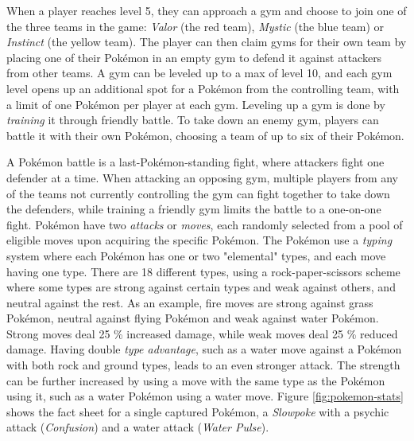 When a player reaches level 5, they can approach a gym and choose to join one of the three teams in the game: \emph{Valor} (the red team), \emph{Mystic} (the blue team) or \emph{Instinct} (the yellow team). The player can then claim gyms for their own team by placing one of their Pokémon in an empty gym to defend it against attackers from other teams. A gym can be leveled up to a max of level 10, and each gym level opens up an additional spot for a Pokémon from the controlling team, with a limit of one Pokémon per player at each gym. Leveling up a gym is done by \emph{training} it through friendly battle. To take down an enemy gym, players can battle it with their own Pokémon, choosing a team of up to six of their Pokémon.

A Pokémon battle is a last-Pokémon-standing fight, where attackers fight one defender at a time. When attacking an opposing gym, multiple players from any of the teams not currently controlling the gym can fight together to take down the defenders, while training a friendly gym limits the battle to a one-on-one fight. Pokémon have two \emph{attacks} or \emph{moves}, each randomly selected from a pool of eligible moves upon acquiring the specific Pokémon. The Pokémon use a \emph{typing} system where each Pokémon has one or two "elemental" types, and each move having one type. There are 18 different types, using a rock-paper-scissors scheme where some types are strong against certain types and weak against others, and neutral against the rest. As an example, fire moves are strong against grass Pokémon, neutral against flying Pokémon and weak against water Pokémon. Strong moves deal 25 \% increased damage, while weak moves deal 25 \% reduced damage. Having double \emph{type advantage}, such as a water move against a Pokémon with both rock and ground types, leads to an even stronger attack. The strength can be further increased by using a move with the same type as the Pokémon using it, such as a water Pokémon using a water move. Figure \ref{fig:pokemon-stats} shows the fact sheet for a single captured Pokémon, a \emph{Slowpoke} with a psychic attack (\emph{Confusion}) and a water attack (\emph{Water Pulse}).

